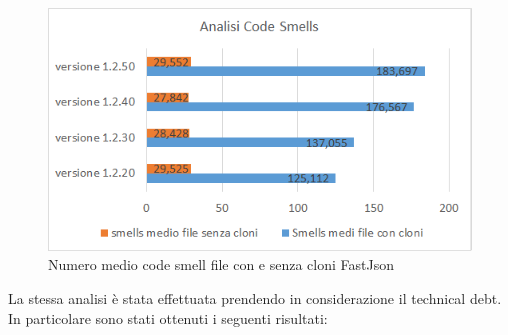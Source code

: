 \begin{figure}[h]
	\centering
	\includegraphics[scale=0.75, trim = 0cm 0cm 0cm 0cm, clip=true]{Grafici_fastJson/CodeSmell.png}
	\caption{Numero medio code smell file con e senza cloni FastJson}
	\label{fig:codeSmellFastjson}
\end{figure}
La stessa analisi è stata effettuata prendendo in considerazione il technical debt. In particolare sono stati ottenuti i seguenti risultati:
